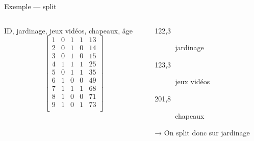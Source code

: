 \begin{frame}{Exemple — split}
  \begin{columns}
    \begin{column}{.5\textwidth}
      ID, jardinage, jeux vidéos, chapeaux, âge
      \[
        \begin{bmatrix}
          1 & 0 & 1 & 1 & 13  \\
          2 & 0 & 1 & 0 & 14 \\
          3 & 0 & 1 & 0 & 15 \\
          4 & 1 & 1 & 1 & 25 \\
          5 & 0 & 1 & 1 & 35 \\
          6 & 1 & 0 & 0 & 49 \\
          7 & 1 & 1 & 1 & 68 \\
          8 & 1 & 0 & 0 & 71 \\
          9 & 1 & 0 & 1 & 73 \\
        \end{bmatrix}
      \]
    \end{column}
    \begin{column}{.5\textwidth}
      \begin{description}
      \item[122,3] jardinage
      \item[123,3] jeux vidéos
      \item[201,8] chapeaux
      \end{description}
      → On split donc sur jardinage
    \end{column}
  \end{columns}
\end{frame}


